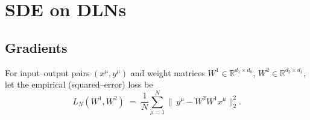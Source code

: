 \documentclass[11pt]{article}
\begin{document}
\section{SDE on DLNs}
\begin{comment}
Consider a two layer linear network with weight matrices $W^1$ and $W^2$ and input data $x^{\mu}$ and output data $y^{\mu}$. The empirical loss is given by:
\begin{align}
L_N(W^1, W^2; D_N) = \frac{1}{N} \sum_{\mu=1}^N ||y^{\mu} - W^2 W^1 x^{\mu}||_2
\end{align}
The gradient is given by:
\begin{align}
    g_{mn}^{\nu} & = \frac{\partial}{\partial W_{mn}^{\nu}} L_N(W^1, W^2) \\ 
    & = \frac{1}{N} \frac{\partial}{\partial W_{mn}^{\nu}} \sum_{\mu=1}^N (y^{\mu T}y^{\mu} - x^{\mu T}W^{1T}W^{2T}y^{\mu} - y^{\mu T}W^{2}W^{1}x^{\mu} + x^{\mu T}W^{1T}W^{2T}W^{2}W^1x^{\mu}) \\
    & = \frac{1}{N} \frac{\partial}{\partial W_{mn}^{\nu}} \sum_{\mu=1}^N (y^{\mu }_i y^{\mu}_i - x^{\mu}_i W^{1}_{ki}W^{2}_{jk}y^{\mu}_j - y^{\mu}_iW^{2}_{ik}W^{1}_{kj}x^{\mu}_j + x^{\mu}_lW^{1}_{kl}W^{2}_{ki}W^{2}_{ip}W^1_{pr}x^{\mu}_{r})\\
\end{align}
Let's compute the gradient w.r.t to the first weight matrix $W^1$.
\begin{align}
    g^1_{mn} & = \frac{1}{N} \sum_{\mu=1}^N ( - x^{\mu}_i\delta_{km,in}W^{2}_{jk}y^{\mu}_j - y^{\mu}_iW^{2}_{ik}\delta_{km, jn}x^{\mu}_j + x^{\mu}_l\delta_{km, ln}W^{2}_{ki}W^{2}_{ip}W^1_{pr}x^{\mu}_{r} + x^{\mu}_lW^{1}_{kl}W^{2}_{ki}W^{2}_{ip}\delta_{pm, rn}x^{\mu}_{r})\\
    & = \frac{1}{N} \sum_{\mu=1}^N - x^{\mu}_n W^{2}_{jm}y^{\mu}_j - y^{\mu}_iW^{2}_{im}x^{\mu}_n + x^{\mu}_nW^{2}_{mi}W^{2}_{ip}W^1_{pr}x^{\mu}_{r} + x^{\mu}_lW^{1}_{kl}W^{2}_{ki}W^{2}_{im}x^{\mu}_{n}\\
\end{align}
Which in matrix form is:
\begin{align}
    g^1 = \frac{2}{N} \sum_{\mu=1}^N (- x^{\mu}y^{\mu T}W^{2T} + x^{\mu}x^{\mu T}W^{1T}W^{2T}W^{2})  
\end{align}
\end{comment}
\subsection{Gradients}
For input–output pairs \((x^{\mu},y^{\mu})\) and weight matrices
\(W^{1}\in\mathbb R^{d_{1}\times d_{0}}\), \(W^{2}\in\mathbb R^{d_{2}\times d_{1}}\),
let the empirical (squared–error) loss be
\[
L_N(W^{1},W^{2})
   \;=\;
   \frac{1}{N}\sum_{\mu=1}^{N}
   \bigl\lVert\,y^{\mu}-W^{2}W^{1}x^{\mu}\bigr\rVert_2^{2}.
\]
\end{document}
